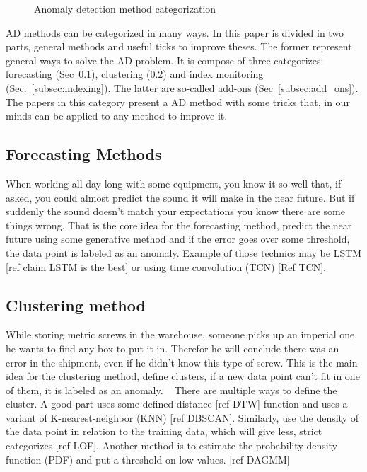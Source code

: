 \documentclass[../../main/main.tex]{subfiles}
\begin{document}
    \begin{figure*}[hp]
        \makebox[\textwidth]{}
        \caption{Anomaly detection method categorization}
    \end{figure*}

    \ac{AD} methods can be categorized in many ways. In this paper is divided in two parts,
    general methods and useful ticks to improve theses. The former represent general ways to 
    solve the \ac{AD} problem. It is compose of three categorizes: forecasting (Sec~\ref{subsec:forecasting}), clustering (\ref{subsec:clustering}) and index monitoring (Sec.~\ref{subsec:indexing}).
    The latter are so-called add-ons (Sec~\ref{subsec:add_ons}). The papers in this category present a \ac{AD} method with some tricks that,
    in our minds can be applied to any method to improve it.
    \subsection{Forecasting Methods}\label{subsec:forecasting}
        When working all day long with some equipment, you know it so well that, if asked, you could almost 
        predict the sound it will make in the near future. But if suddenly the sound doesn't match 
        your expectations you know there are some things wrong.
        That is the core idea for the forecasting method, predict the near future using some generative method
        and if the error goes over some threshold, the data point is labeled as an anomaly. Example of those technics
        may be \ac{LSTM} [ref claim LSTM is the best] or using time convolution (TCN) [Ref TCN].
    
    \subsection{Clustering method}\label{subsec:clustering}
        While storing metric screws in the warehouse, someone picks up an imperial one, he wants to find any box to put it in.
        Therefor he will conclude there was an error in the shipment, even if he didn't know this type of screw. This is the main 
        idea for the clustering method, define clusters, if a new data point can't fit in one of them, it is labeled as an anomaly.  
        There are multiple ways to define the cluster. A good part uses some defined distance [ref DTW] function and uses a variant of K-nearest-neighbor (KNN)
        [ref DBSCAN]. Similarly, use the density of the data point in relation to the training data, which will 
        give less, strict categorizes [ref LOF]. Another method is to estimate the probability density function (PDF) 
        and put a threshold on low values. [ref DAGMM]
    
\end{document}
